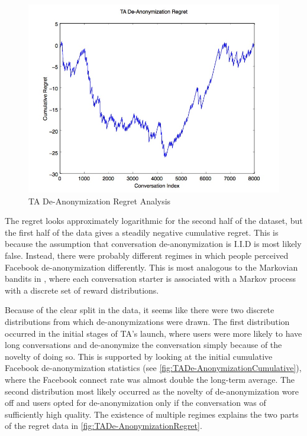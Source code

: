 \begin{figure}[H]
\centering
\includegraphics[trim= 0mm 0mm 0mm 0mm, clip, scale=0.5]{./Figures/TADe-AnonymizationRegret.jpg}
\caption{TA De-Anonymization Regret Analysis}
\label{fig:TADe-AnonymizationRegret}
\end{figure}

The regret looks approximately logarithmic for the second half of the dataset, but the first half of the data gives a steadily negative cumulative regret. This is because the assumption that conversation de-anonymization is I.I.D is most likely false. Instead, there were probably different regimes in which people perceived Facebook de-anonymization differently. This is most analogous to the Markovian bandits in \cite{bubeck12}, where each conversation starter is associated with a Markov process with a discrete set of reward distributions.

Because of the clear split in the data, it seems like there were two discrete distributions from which de-anonymizations were drawn. The first distribution occurred in the initial stages of TA's launch, where users were more likely to have long conversations and de-anonymize the conversation simply because of the novelty of doing so. This is supported by looking at the initial cumulative Facebook de-anonymization statistics (see \autoref{fig:TADe-AnonymizationCumulative}), where the Facebook connect rate was almost double the long-term average. The second distribution most likely occurred as the novelty of de-anonymization wore off and users opted for de-anonymization only if the conversation was of sufficiently high quality. The existence of multiple regimes explains the two parts of the regret data in \autoref{fig:TADe-AnonymizationRegret}.

